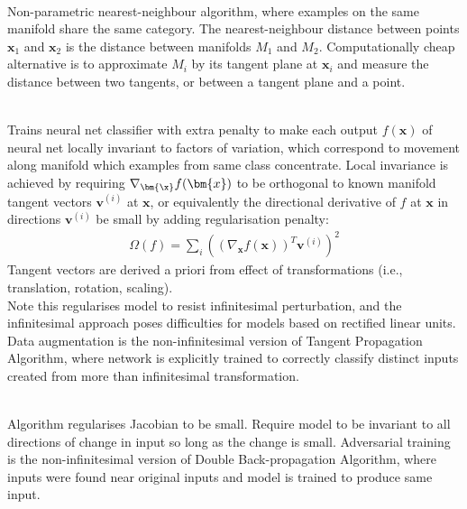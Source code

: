 \begin{remark} \\
Non-parametric nearest-neighbour algorithm, where examples on the same manifold share the same category. The nearest-neighbour distance between points $\bm{x}_1$ and $\bm{x}_2$ is the distance between manifolds $M_1$ and $M_2$. Computationally cheap alternative is to approximate $M_i$ by its tangent plane at $\bm{x}_i$ and measure the distance between two tangents, or between a tangent plane and a point.
\end{remark}

\begin{remark} \\
Trains neural net classifier with extra penalty to make each output $f(\bm{x})$ of neural net locally invariant to factors of variation, which correspond to movement along manifold which examples from same class concentrate. Local invariance is achieved by requiring $\nabla_{\bm{\x}}f(\bm{x})$ to be orthogonal to known manifold tangent vectors $\bm{v}^{(i)}$ at $\bm{x}$, or equivalently the directional derivative of $f$ at $\bm{x}$ in directions $\bm{v}^{(i)}$ be small by adding regularisation penalty:
\begin{align}
\Omega(f) = \sum\limits_i \left( \left( \nabla_{\bm{x}} f(\bm{x}) \right)^T \bm{v}^{(i)} \right)^2 \nonumber
\end{align}
Tangent vectors are derived a priori from effect of transformations (i.e., translation, rotation, scaling).\\
Note this regularises model to resist infinitesimal perturbation, and the infinitesimal approach poses difficulties for models based on rectified linear units.\\
Data augmentation is the non-infinitesimal version of Tangent Propagation Algorithm, where network is explicitly trained to correctly classify distinct inputs created from more than infinitesimal transformation.
\end{remark}

\begin{remark} \\
Algorithm regularises Jacobian to be small. Require model to be invariant to all directions of change in input so long as the change is small. Adversarial training is the non-infinitesimal version of Double Back-propagation Algorithm, where inputs were found near original inputs and model is trained to produce same input.
\end{remark}


